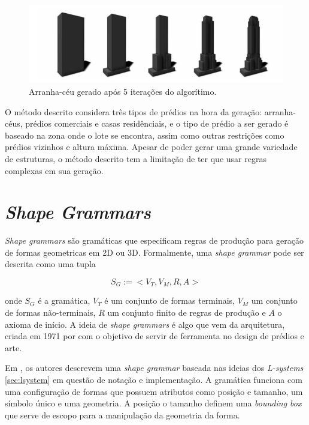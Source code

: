 \documentclass[a4paper, 11pt]{article}
\begin{document}
    \begin{figure}[h]
        \centering
        \includegraphics[width=\textwidth]{imgs/skyscrapper.png}
        \caption{Arranha-céu gerado após 5 iterações do algorítimo.}
        \label{fig:skyscrapper}
    \end{figure}    

    O método descrito considera três tipos de prédios na hora da geração: arranha-céus, prédios comerciais e casas residênciais, e o tipo de prédio a ser gerado é baseado na zona onde o lote se encontra, assim como outras restrições como prédios vizinhos e altura máxima. Apesar de poder gerar uma grande variedade de estruturas, o método descrito tem a limitação de ter que usar regras complexas em sua geração. 
        
    \section{\textit{Shape Grammars}} \label{sec:shape}
    \textit{Shape grammars} são gramáticas que especificam regras de produção para geração de formas geometricas em 2D ou 3D. Formalmente, uma \textit{shape grammar} pode ser descrita como uma tupla \cite{Zawadzki:2013:GSTF}

    $$ S_G := <V_T, V_M, R, A> $$  

    onde $S_G$ é a gramática, $V_T$ é um conjunto de formas terminais, $V_M$ um conjunto de formas não-terminais, $R$ um conjunto finito de regras de produção e $A$ o axioma de início. A ideia de \textit{shape grammars} é algo que vem da arquitetura, criada em 1971 por \cite{Stiny71shapegrammars} com o objetivo de servir de ferramenta no design de prédios e arte. 

    Em \cite{Muller:2006:PMB:1141911.1141931}, os autores descrevem uma \textit{shape grammar} baseada nas ideias dos \textit{L-systems} \ref{sec:lsystem} em questão de notação e implementação. A gramática funciona com uma configuração de formas que possuem atributos como posição e tamanho, um símbolo único e uma geometria. A posição o tamanho definem uma \textit{bounding box} que serve de escopo para a manipulação da geometria da forma.
\end{document}
